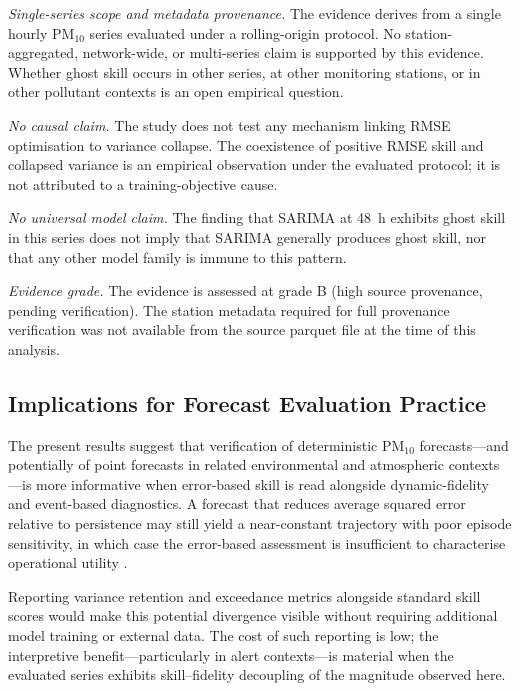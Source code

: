 \documentclass[12pt]{article}
\begin{document}
\emph{Single-series scope and metadata provenance.}
The evidence derives from a single hourly PM$_{10}$ series evaluated
under a rolling-origin protocol. No station-aggregated, network-wide,
or multi-series claim is supported by this evidence. Whether ghost skill
occurs in other series, at other monitoring stations, or in other
pollutant contexts is an open empirical question.

\emph{No causal claim.}
The study does not test any mechanism linking RMSE optimisation to
variance collapse. The coexistence of positive RMSE skill and collapsed
variance is an empirical observation under the evaluated protocol; it
is not attributed to a training-objective cause.

\emph{No universal model claim.}
The finding that SARIMA at 48~h exhibits ghost skill in this series
does not imply that SARIMA generally produces ghost skill, nor that
any other model family is immune to this pattern.

\emph{Evidence grade.}
The evidence is assessed at grade B (high source provenance, pending
verification). The station metadata required for full provenance
verification was not available from the source parquet file at the
time of this analysis.

\subsection{Implications for Forecast Evaluation Practice}
\label{sec:disc_implications}

The present results suggest that verification of deterministic
PM$_{10}$ forecasts---and potentially of point forecasts in related
environmental and atmospheric contexts---is more informative when
error-based skill is read alongside dynamic-fidelity and event-based
diagnostics. A forecast that reduces average squared error relative
to persistence may still yield a near-constant trajectory with poor
episode sensitivity, in which case the error-based assessment is
insufficient to characterise operational utility \citep{gneiting2011,jolliffe2012}.

Reporting variance retention and exceedance metrics alongside standard
skill scores would make this potential divergence visible without
requiring additional model training or external data. The cost of such
reporting is low; the interpretive benefit---particularly in alert
contexts---is material when the evaluated series exhibits skill--fidelity
decoupling of the magnitude observed here.
\end{document}
